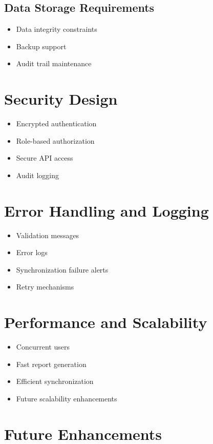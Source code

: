 \documentclass[12pt]{article}
\begin{document}
\subsection{Data Storage Requirements}

\begin{itemize}
\item Data integrity constraints
\item Backup support
\item Audit trail maintenance
\end{itemize}

\section{Security Design}

\begin{itemize}
\item Encrypted authentication
\item Role-based authorization
\item Secure API access
\item Audit logging
\end{itemize}

\section{Error Handling and Logging}

\begin{itemize}
\item Validation messages
\item Error logs
\item Synchronization failure alerts
\item Retry mechanisms
\end{itemize}

\section{Performance and Scalability}

\begin{itemize}
\item Concurrent users
\item Fast report generation
\item Efficient synchronization
\item Future scalability enhancements
\end{itemize}

\section{Future Enhancements}
\end{document}

